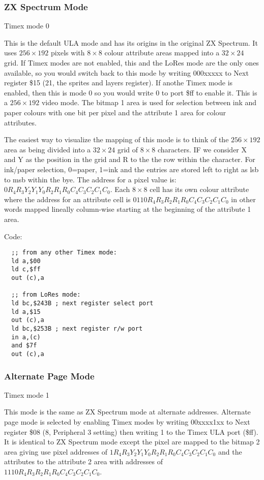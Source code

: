 \subsubsection{ZX Spectrum Mode}

Timex mode 0

This is the default ULA mode and has its origins in the original ZX
Spectrum. It uses $256\times192$ pixels with $8\times8$ colour
attribute areas mapped into a $32\times24$ grid. If Timex modes are
not enabled, this and the LoRes mode are the only ones available, so
you would switch back to this mode by writing 000xxxxx to Next
register \$15 (21, the sprites and layers register). If anothe Timex
mode is enabled, then this is mode 0 so you would write 0 to port \$ff
to enable it. This is a $256\times192$ video mode. The bitmap 1 area
is used for selection between ink and paper colours with one bit per
pixel and the attribute 1 area for colour attributes.

The easiest way to visualize the mapping of this mode is to think of
the $256\times192$ area as being divided into a $32\times24$ grid of
$8\times8$ characters.  IF we consider X and Y as the position in the
grid and R to the the row within the character.  For ink/paper
selection, 0=paper, 1=ink and the entries are stored left to right as
lsb to msb within the bye.  The address for a pixel value is:
$0R_4R_3Y_2Y_1Y_0R_2R_1R_0C_4C_3C_2C_1C_0$. Each $8\times8$ cell has
its own colour attribute where the address for an attribute cell is
$0110R_4R_3R_2R_1R_0C_4C_3C_2C_1C_0$ in other words mapped lineally
column-wise starting at the beginning of the attribute 1 area.

Code:
\begin{verbatim}
  ;; from any other Timex mode:
  ld a,$00
  ld c,$ff
  out (c),a

  ;; from LoRes mode:
  ld bc,$243B ; next register select port
  ld a,$15
  out (c),a
  ld bc,$253B ; next register r/w port
  in a,(c)
  and $7f
  out (c),a
\end{verbatim}

\subsubsection{Alternate Page Mode}

Timex mode 1

This mode is the same as ZX Spectrum mode at alternate
addresses. Alternate page mode is selected by enabling Timex modes by
writing 00xxxx1xx to Next register \$08 (8, Peripheral 3 setting) then
writing 1 to the Timex ULA port (\$ff).  It is identical to ZX
Spectrum mode except the pixel are mapped to the bitmap 2 area giving
use pixel addresses of $1R_4R_3Y_2Y_1Y_0R_2R_1R_0C_4C_3C_2C_1C_0$ and
the attributes to the attribute 2 area with addresses of
$1110R_4R_3R_2R_1R_0C_4C_3C_2C_1C_0$.

